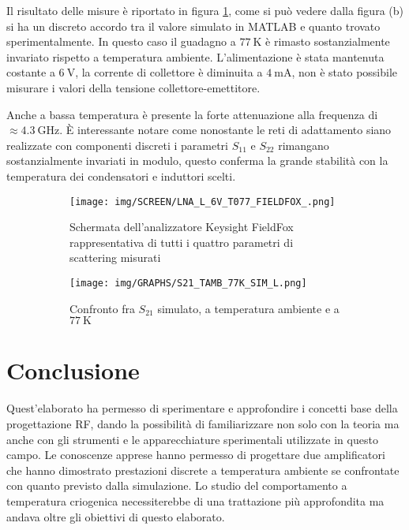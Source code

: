 \documentclass[12pt,oneside]{book}
\begin{document}
Il risultato delle misure è riportato in figura \ref{cryo_l}, come si può vedere dalla figura (b) si ha un discreto accordo tra il valore simulato in MATLAB e quanto trovato sperimentalmente. In questo caso il guadagno a $\SI{77}{\kelvin}$ è rimasto sostanzialmente invariato rispetto a temperatura ambiente. L'alimentazione è stata mantenuta costante a $\SI{6}{\volt}$, la corrente di collettore è diminuita a $\SI{4}{\milli\ampere}$, non è stato possibile misurare i valori della tensione collettore-emettitore.

Anche a bassa temperatura è presente la forte attenuazione alla frequenza di $\approx\SI{4.3}{\giga\hertz}$. È interessante notare come nonostante le reti di adattamento siano realizzate con componenti discreti i parametri $S_{11}$ e $S_{22}$ rimangano sostanzialmente invariati in modulo, questo conferma la grande stabilità con la temperatura dei condensatori e induttori scelti.

\begin{figure}[!htbp]
    \centering
        \begin{subfigure}[t]{0.48\textwidth}
        \centering
        \texttt{[image: img/SCREEN/LNA\_L\_6V\_T077\_FIELDFOX\_.png]}
        \caption{Schermata dell'analizzatore Keysight FieldFox rappresentativa di tutti i quattro parametri di scattering misurati}
    \end{subfigure}
    \hfill
    \begin{subfigure}[t]{0.48\textwidth}
        \centering
        \texttt{[image: img/GRAPHS/S21\_TAMB\_77K\_SIM\_L.png]}
        \caption{Confronto fra $S_{21}$ simulato, a temperatura ambiente e a $\SI{77}{\kelvin}$}
    \end{subfigure}
    \caption{}
    \label{cryo_l}
\end{figure}


\chapter{Conclusione}
Quest'elaborato ha permesso di sperimentare e approfondire i concetti base della progettazione RF, dando la possibilità di familiarizzare non solo con la teoria ma anche con gli strumenti e le apparecchiature sperimentali utilizzate in questo campo.
Le conoscenze apprese hanno permesso di progettare due amplificatori che hanno dimostrato prestazioni discrete a temperatura ambiente se confrontate con quanto previsto dalla simulazione. Lo studio del comportamento a temperatura criogenica necessiterebbe di una trattazione più approfondita ma andava oltre gli obiettivi di questo elaborato.



\nocite{*}

\end{document}

